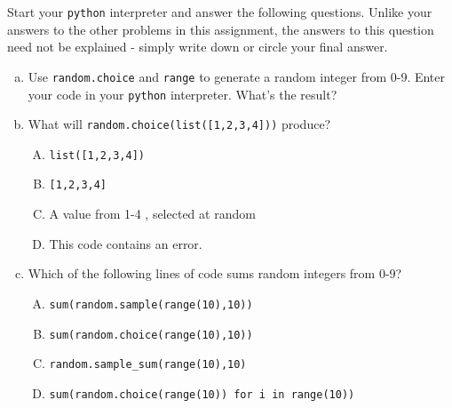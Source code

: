 \documentclass[12pt]{article}
\newenvironment{question}[2][Question]{\begin{trivlist}
\item[\hskip \labelsep {\bfseries #1}\hskip \labelsep {\bfseries #2.}]}{\end{trivlist}}
\begin{document}
\pagebreak
 \begin{question}{6}   Start your \texttt{python} interpreter and answer the following questions. Unlike your answers to the other problems 
 in this assignment, the answers to this question need not be explained - simply write down or circle your final answer.  
\begin{enumerate}[(a)]
 \item Use \texttt{random.choice} and \texttt{range} to generate a random integer from 0-9. Enter your code in your \texttt{python} interpreter. What's the result?\item What will \texttt{random.choice(list([1,2,3,4]))} produce?
     \begin{enumerate}[(A)]
         \item \texttt{list([1,2,3,4])}
         \item \texttt{[1,2,3,4]}
         \item A value from 1-4 , selected at random
         \item This code contains an error.
      \end{enumerate}
 \item Which of the following lines of code sums random integers from 0-9?
      \begin{enumerate}[(A)]
         \item \texttt{sum(random.sample(range(10),10))}
         \item \texttt{sum(random.choice(range(10),10))}
         \item \texttt{random.sample\_sum(range(10),10)}
         \item \texttt{sum(random.choice(range(10)) for i in range(10))}
      \end{enumerate}
 \end{enumerate}
\end{question} 
\end{document}
